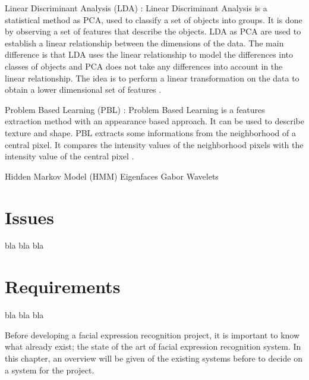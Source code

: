 \noindent Linear Discriminant Analysis (LDA) : Linear Discriminant Analysis is a statistical method as PCA, used to classify a set of objects into groups. It is done by observing a set of features that describe the objects. LDA as PCA are used to establish a linear relationship between the dimensions of the data. The main difference is that LDA uses the linear relationship to model the differences into classes of objects and PCA does not take any differences into account in the linear relationship. The idea is to perform a linear transformation on the data to obtain a lower dimensional set of features \cite{GAN08}.
\newline

\noindent Problem Based Learning (PBL) : Problem Based Learning is a features extraction method with an appearance based approach. It can be used to describe texture and shape. PBL extracts some informations from the neighborhood of a central pixel. It compares the intensity values of the neighborhood pixels with the intensity value of the central pixel  \cite{GAN08}.
\newline

\noindent Hidden Markov Model (HMM)
\newline
\noindent Eigenfaces
\newline
\noindent Gabor Wavelets
\newline

\section{Issues}

\noindent bla bla bla
\newline

\section{Requirements}

\noindent bla bla bla
\newline









\noindent Before developing a facial expression recognition project, it is important to know what already exist; the state of the art of facial expression recognition system. In this chapter, an overview will be given of the existing systems before to decide on a system for the project.
\newline
